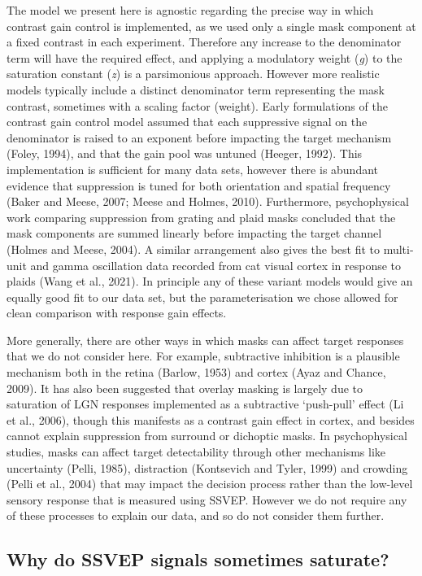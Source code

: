 \documentclass[]{article}
\begin{document}
The model we present here is agnostic regarding the precise way in which contrast gain control is implemented, as we used only a single mask component at a fixed contrast in each experiment. Therefore any increase to the denominator term will have the required effect, and applying a modulatory weight (\emph{g}) to the saturation constant (\emph{z}) is a parsimonious approach. However more realistic models typically include a distinct denominator term representing the mask contrast, sometimes with a scaling factor (weight). Early formulations of the contrast gain control model assumed that each suppressive signal on the denominator is raised to an exponent before impacting the target mechanism (Foley, 1994), and that the gain pool was untuned (Heeger, 1992). This implementation is sufficient for many data sets, however there is abundant evidence that suppression is tuned for both orientation and spatial frequency (Baker and Meese, 2007; Meese and Holmes, 2010). Furthermore, psychophysical work comparing suppression from grating and plaid masks concluded that the mask components are summed linearly before impacting the target channel (Holmes and Meese, 2004). A similar arrangement also gives the best fit to multi-unit and gamma oscillation data recorded from cat visual cortex in response to plaids (Wang et al., 2021). In principle any of these variant models would give an equally good fit to our data set, but the parameterisation we chose allowed for clean comparison with response gain effects.

More generally, there are other ways in which masks can affect target responses that we do not consider here. For example, subtractive inhibition is a plausible mechanism both in the retina (Barlow, 1953) and cortex (Ayaz and Chance, 2009). It has also been suggested that overlay masking is largely due to saturation of LGN responses implemented as a subtractive `push-pull' effect (Li et al., 2006), though this manifests as a contrast gain effect in cortex, and besides cannot explain suppression from surround or dichoptic masks. In psychophysical studies, masks can affect target detectability through other mechanisms like uncertainty (Pelli, 1985), distraction (Kontsevich and Tyler, 1999) and crowding (Pelli et al., 2004) that may impact the decision process rather than the low-level sensory response that is measured using SSVEP. However we do not require any of these processes to explain our data, and so do not consider them further.

\hypertarget{why-do-ssvep-signals-sometimes-saturate}{%
\subsection{Why do SSVEP signals sometimes saturate?}\label{why-do-ssvep-signals-sometimes-saturate}}
\end{document}
